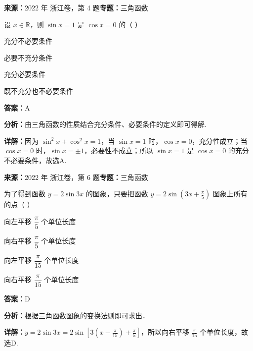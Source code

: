 \begin{question}[points=4]
\textbf{来源：}2022 年 浙江卷，第 4 题\quad \textbf{专题：}三角函数\par
设 $x \in \mathbb{R}$，则 $\sin x = 1$ 是 $\cos x = 0$ 的（ ）
\begin{choices}
  \item 充分不必要条件
  \item 必要不充分条件
  \item 充分必要条件
  \item 既不充分也不必要条件
\end{choices}
\begin{solution}
\textbf{答案：}A

\textbf{分析：}由三角函数的性质结合充分条件、必要条件的定义即可得解.

\textbf{详解：}因为 $\sin^2 x + \cos^2 x = 1$，当 $\sin x = 1$ 时，$\cos x = 0$，充分性成立；当 $\cos x = 0$ 时，$\sin x = \pm 1$，必要性不成立；所以 $\sin x = 1$ 是 $\cos x = 0$ 的充分不必要条件，故选A.
\end{solution}
\end{question}

\begin{question}[points=4]
\textbf{来源：}2022 年 浙江卷，第 6 题\quad \textbf{专题：}三角函数\par
为了得到函数 $y = 2\sin 3x$ 的图象，只要把函数 $y = 2\sin\left(3x + \frac{\pi}{5}\right)$ 图象上所有的点（ ）
\begin{choices}
  \item 向左平移 $\dfrac{\pi}{5}$ 个单位长度
  \item 向右平移 $\dfrac{\pi}{5}$ 个单位长度
  \item 向左平移 $\dfrac{\pi}{15}$ 个单位长度
  \item 向右平移 $\dfrac{\pi}{15}$ 个单位长度
\end{choices}
\begin{solution}
\textbf{答案：}D

\textbf{分析：}根据三角函数图象的变换法则即可求出．

\textbf{详解：}$y = 2\sin 3x = 2\sin\left[3\left(x - \frac{\pi}{15}\right) + \frac{\pi}{5}\right]$，所以向右平移 $\frac{\pi}{15}$ 个单位长度，故选D.
\end{solution}
\end{question}

